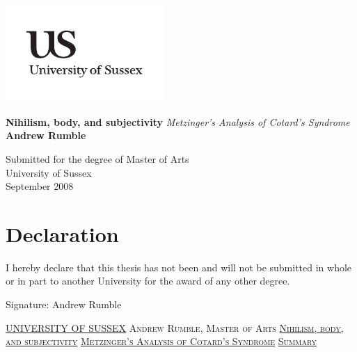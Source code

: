 \documentclass[a4paper,11pt]{report}
\newcommand{\linespacing}{1.5}
\renewcommand{\baselinestretch}{\linespacing}
\begin{document}




\thispagestyle{empty}
\begin{flushright}
\includegraphics[width=6cm]{uslogo}
\end{flushright}	
\vskip40mm
\begin{center}
\huge\textbf{Nihilism, body, and subjectivity}
\vskip2mm
\LARGE\textit{Metzinger's Analysis of Cotard's Syndrome}
\vskip5mm
\Large\textbf{Andrew Rumble}
\normalsize
\end{center}
\vfill
\begin{flushleft}
\large
Submitted for the degree of Master of Arts \\
University of Sussex	\\
September 2008
\end{flushleft}		


\chapter*{Declaration}
I hereby declare that this thesis has not been and will not be submitted in whole or in part to another University for the award of any other degree.
 

\vskip5mm
Signature:
\vskip20mm
Andrew Rumble


\thispagestyle{empty}
\newpage
\null\vskip10mm
\begin{center}
\large
\underline{UNIVERSITY OF SUSSEX}
\vskip20mm
\textsc{Andrew Rumble, Master of Arts}
\vskip20mm
\underline{\textsc{Nihilism, body, and subjectivity}}
\vskip0mm
\underline{\textsc{Metzinger's Analysis of Cotard's Syndrome}}
\vskip20mm
\underline{\textsc{Summary}}
\vskip2mm
\end{center}
\renewcommand{\baselinestretch}{1.0}
\small\normalsize
\end{document}
